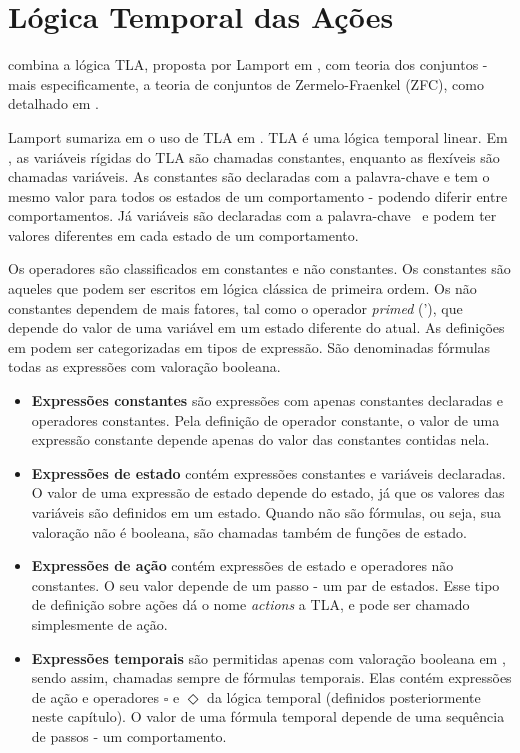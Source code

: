 \section{Lógica Temporal das Ações}

\TLA combina a lógica TLA, proposta por Lamport em \cite{tlaformalization}, com teoria dos conjuntos - mais especificamente, a teoria de conjuntos de Zermelo-Fraenkel (ZFC), como detalhado em \cite{merzlogic}.

Lamport sumariza em \cite{proofsystem} o uso de TLA em \TLAA. TLA é uma lógica temporal linear. Em \TLAA, as variáveis rígidas do TLA são chamadas constantes, enquanto as flexíveis são chamadas variáveis. As constantes são declaradas com a palavra-chave \CONSTANTS e tem o mesmo valor para todos os estados de um comportamento - podendo diferir entre comportamentos. Já variáveis são declaradas com a palavra-chave \VARIABLES\ e podem ter valores diferentes em cada estado de um comportamento.

Os operadores são classificados em constantes e não constantes. Os constantes são aqueles que podem ser escritos em lógica clássica de primeira ordem. Os não constantes dependem de mais fatores, tal como o operador \textit{primed} ('), que depende do valor de uma variável em um estado diferente do atual. As definições em \TLA podem ser categorizadas em tipos de expressão. São denominadas fórmulas todas as expressões com valoração booleana.
\begin{itemize}
  \item \textbf{Expressões constantes} são expressões com apenas constantes declaradas e o\-pe\-ra\-do\-res constantes. Pela definição de operador constante, o valor de uma expressão constante depende apenas do valor das constantes contidas nela.
  \item \textbf{Expressões de estado} contém expressões constantes e variáveis declaradas. O valor de uma expressão de estado depende do estado, já que os valores das variáveis são definidos em um estado. Quando não são fórmulas, ou seja, sua valoração não é booleana, são chamadas também de funções de estado.
  \item \textbf{Expressões de ação} contém expressões de estado e operadores não constantes. O seu valor depende de um passo - um par de estados. Esse tipo de definição sobre ações dá o nome \textit{actions} a TLA, e pode ser chamado simplesmente de ação.
  \item \textbf{Expressões temporais} são permitidas apenas com valoração booleana em \TLAA, sendo assim, chamadas sempre de fórmulas temporais. Elas contém expressões de ação e operadores $\square$ e $\Diamond$ da lógica temporal (definidos posteriormente neste capítulo). O valor de uma fórmula temporal depende de uma sequência de passos - um comportamento.
\end{itemize}

